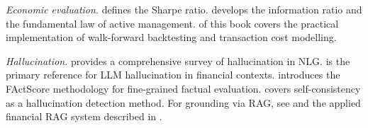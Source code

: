 \emph{Economic evaluation.} \citet{sharpe1994sharpe} defines the Sharpe ratio.
\citet{grinold1999active} develops the information ratio and the fundamental law of
active management.  of this book covers the
practical implementation of walk-forward backtesting and transaction cost modelling.

\emph{Hallucination.} \citet{ji2023survey} provides a comprehensive survey of
hallucination in NLG. \citet{kang2023hallucination} is the primary reference for
LLM hallucination in financial contexts. \citet{min2023factscore} introduces the
FActScore methodology for fine-grained factual evaluation. \citet{manakul2023selfcheckgpt}
covers self-consistency as a hallucination detection method. For grounding via RAG,
see \citet{lewis2020rag} and the applied financial RAG system described in
\citet{wang2025finsage}.
